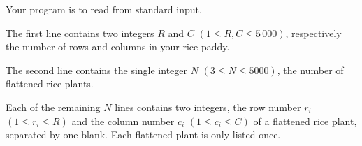 Your program is to read from standard input. 

The first line contains two integers $R$ and $C$ $(1 \le R, C \le 5\,000)$, respectively the number of rows and columns in your rice paddy. 

The second line contains the single integer $N$ $(3 \le N \le 5000)$, the number of flattened rice plants. 

Each of the remaining $N$ lines contains two integers, the row number $r_i$ $(1 \le r_i \le R)$ and the column number $c_i$ $(1 \le c_i \le C)$ of a flattened rice plant, separated by one blank. Each flattened plant is only listed once.
